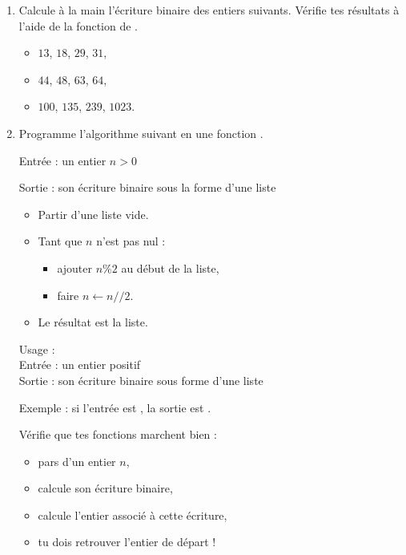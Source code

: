 \documentclass[11pt,class=report,crop=false]{standalone}
\begin{document}
\begin{activite}[]


\begin{enumerate}
  \item Calcule à la main l'écriture binaire des entiers suivants. Vérifie tes résultats à l'aide de la fonction  de \Python.
  
   \begin{itemize}
    \item $13$, $18$, $29$, $31$,
    \item $44$, $48$, $63$, $64$,
    \item $100$, $135$, $239$, $1023$.
  \end{itemize} 
  
  \item
  Programme l'algorithme suivant en une fonction .

  \begin{algorithme}
  Entrée : un entier $n>0$

  Sortie : son écriture binaire sous la forme d'une liste

  \begin{itemize}
    \item Partir d'une liste vide.
    
    \item Tant que $n$ n'est pas nul :
    
     \begin{itemize} 
       \item ajouter $n \% 2$ au début de la liste,
       \item faire $n \leftarrow n//2$.
     \end{itemize}    
         
    \item Le résultat est la liste.
  \end{itemize} 
             
 \end{algorithme}
 
   \begin{fonction}
  Usage :  \\
  Entrée : un entier positif \\
  Sortie : son écriture binaire sous forme d'une liste
  
  \medskip  
  Exemple : si l'entrée est , la sortie est \ci{[1,1,0,0,1,1,0,0]}.
  \end{fonction} 
  
  Vérifie que tes fonctions marchent bien :
  \begin{itemize}
    \item pars d'un entier $n$,
    \item calcule son écriture binaire,
    \item calcule l'entier associé à cette écriture,
    \item tu dois retrouver l'entier de départ !
  \end{itemize}
\end{enumerate}
\end{activite}
\end{document}
